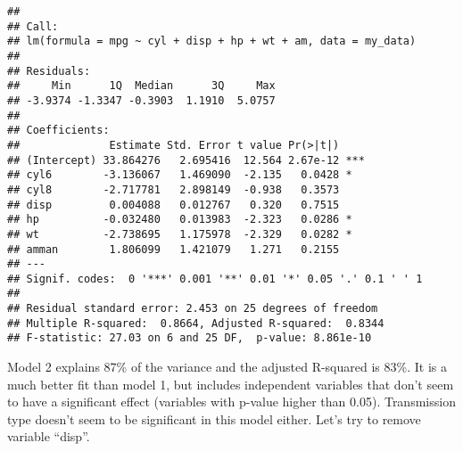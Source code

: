 \documentclass[
]{article}
\begin{document}
\begin{verbatim}
## 
## Call:
## lm(formula = mpg ~ cyl + disp + hp + wt + am, data = my_data)
## 
## Residuals:
##     Min      1Q  Median      3Q     Max 
## -3.9374 -1.3347 -0.3903  1.1910  5.0757 
## 
## Coefficients:
##              Estimate Std. Error t value Pr(>|t|)    
## (Intercept) 33.864276   2.695416  12.564 2.67e-12 ***
## cyl6        -3.136067   1.469090  -2.135   0.0428 *  
## cyl8        -2.717781   2.898149  -0.938   0.3573    
## disp         0.004088   0.012767   0.320   0.7515    
## hp          -0.032480   0.013983  -2.323   0.0286 *  
## wt          -2.738695   1.175978  -2.329   0.0282 *  
## amman        1.806099   1.421079   1.271   0.2155    
## ---
## Signif. codes:  0 '***' 0.001 '**' 0.01 '*' 0.05 '.' 0.1 ' ' 1
## 
## Residual standard error: 2.453 on 25 degrees of freedom
## Multiple R-squared:  0.8664, Adjusted R-squared:  0.8344 
## F-statistic: 27.03 on 6 and 25 DF,  p-value: 8.861e-10
\end{verbatim}

Model 2 explains 87\% of the variance and the adjusted R-squared is
83\%. It is a much better fit than model 1, but includes independent
variables that don't seem to have a significant effect (variables with
p-value higher than 0.05). Transmission type doesn't seem to be
significant in this model either. Let's try to remove variable ``disp''.
\end{document}
